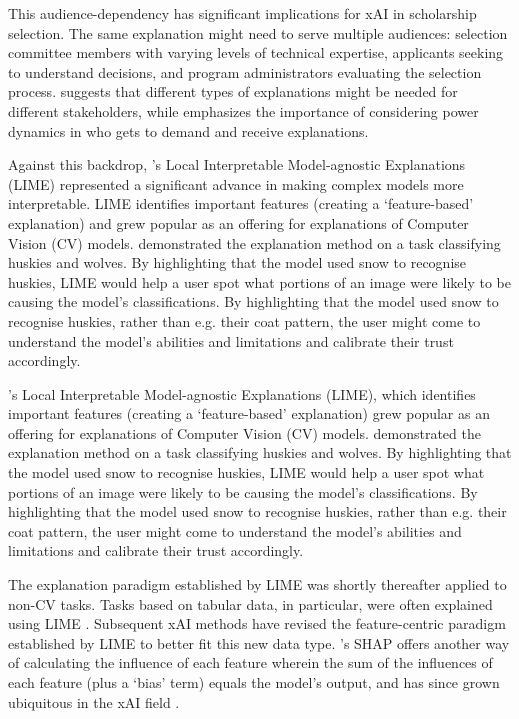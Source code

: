 This audience-dependency has significant implications for xAI in scholarship selection. The same explanation might need to serve multiple audiences: selection committee members with varying levels of technical expertise, applicants seeking to understand decisions, and program administrators evaluating the selection process. \textcite{wachter_counterfactual_2017} suggests that different types of explanations might be needed for different stakeholders, while \textcite{barocas_hidden_2020} emphasizes the importance of considering power dynamics in who gets to demand and receive explanations.

Against this backdrop, \textcite{ribeiro_why_2016}'s Local Interpretable Model-agnostic Explanations (LIME) represented a significant advance in making complex models more interpretable. LIME identifies important features (creating a `feature-based' explanation) and grew popular as an offering for explanations of Computer Vision (CV) models. \textcite{ribeiro_why_2016} demonstrated the explanation method on a task classifying huskies and wolves. By highlighting that the model used snow to recognise huskies, LIME would help a user spot what portions of an image were likely to be causing the model's classifications. By highlighting that the model used snow to recognise huskies, rather than e.g. their coat pattern, the user might come to understand the model's abilities and limitations and calibrate their trust accordingly.

\textcite{ribeiro_why_2016}'s Local Interpretable Model-agnostic Explanations (LIME), which identifies important features (creating a `feature-based' explanation) grew popular as an offering for explanations of Computer Vision (CV) models. \textcite{ribeiro_why_2016} demonstrated the explanation method on a task classifying huskies and wolves. By highlighting that the model used snow to recognise huskies, LIME would help a user spot what portions of an image were likely to be causing the model's classifications. By highlighting that the model used snow to recognise huskies, rather than e.g. their coat pattern, the user might come to understand the model's abilities and limitations and calibrate their trust accordingly.

The explanation paradigm established by LIME was shortly thereafter applied to non-CV tasks. Tasks based on tabular data, in particular, were often explained using LIME \cite{zerilli_explaining_2020}. Subsequent xAI methods have revised the feature-centric paradigm established by LIME to better fit this new data type. \textcite{lundberg_unified_2017}'s SHAP offers another way of calculating the influence of each feature wherein the sum of the influences of each feature (plus a `bias' term) equals the model's output, and has since grown ubiquitous in the xAI field \cite{weerts_human-grounded_2019}.

